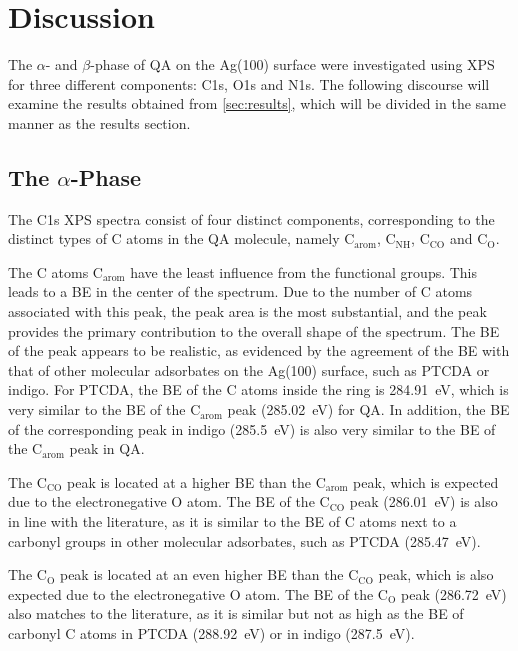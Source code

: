 \chapter{Discussion}

The $\alpha$- and $\beta$-phase of \ac{QA} on the Ag(100) surface were investigated using \ac{XPS} for three different components: C1s, O1s and N1s. The following discourse will examine the results obtained from \autoref{sec:results}, which will be divided in the same manner as the results section.

\section{The \texorpdfstring{$\alpha$}{alpha}-Phase}

The C1s \ac{XPS} spectra consist of four distinct components, corresponding to the distinct types of C atoms in the \ac{QA} molecule, namely $\mathrm{C_{arom}}$, $\mathrm{C_{NH}}$, $\mathrm{C_{CO}}$ and  $\mathrm{C_{O}}$.

The C atoms $\mathrm{C_{arom}}$ have the least influence from the functional groups. This leads to a \ac{BE} in the center of the spectrum. Due to the number of C atoms associated with this peak, the peak area is the most substantial, and the peak provides the primary contribution to the overall shape of the spectrum. The \ac{BE} of the peak appears to be realistic, as evidenced by the agreement of the \ac{BE} with that of other molecular adsorbates on the Ag(100) surface, such as \ac{PTCDA} or indigo. For \ac{PTCDA}, the \ac{BE} of the C atoms inside the ring is 284.91~\si{\eV},\autocite{Bauer2014} which is very similar to the \ac{BE} of the $\mathrm{C_{arom}}$ peak (285.02~\si{\eV}) for \ac{QA}. In addition, the \ac{BE} of the corresponding peak in indigo (285.5~\si{\eV})\autocite{Brunet2011, Michels2021} is also very similar to the \ac{BE} of the $\mathrm{C_{arom}}$ peak in \ac{QA}.

The $\mathrm{C_{CO}}$ peak is located at a higher \ac{BE} than the $\mathrm{C_{arom}}$ peak, which is expected due to the electronegative O atom. The \ac{BE} of the $\mathrm{C_{CO}}$ peak (286.01~\si{\eV}) is also in line with the literature, as it is similar to the \ac{BE} of C atoms next to a carbonyl groups in other molecular adsorbates, such as \ac{PTCDA} (285.47~\si{eV}).\autocite{Bauer2014}

The $\mathrm{C_{O}}$ peak is located at an even higher \ac{BE} than the $\mathrm{C_{CO}}$ peak, which is also expected due to the electronegative O atom. The \ac{BE} of the $\mathrm{C_{O}}$ peak (286.72~\si{\eV}) also matches to the literature, as it is similar but not as high as the \ac{BE} of carbonyl C atoms in \ac{PTCDA} (288.92~\si{eV})\autocite{Bauer2014} or in indigo (287.5~\si{eV})\autocite{Brunet2011, Michels2021}.

